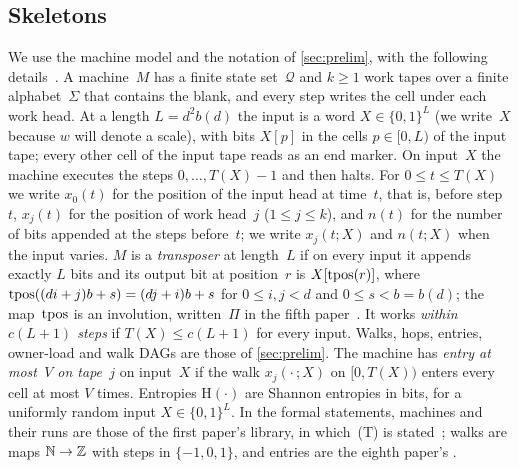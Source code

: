 \subsection{Skeletons}\label{sec:skel-skeletons}

We use the machine model and the notation of \cref{sec:prelim}, with the following
details~\cite[Section~2.1]{BoundedNesting2026}. A machine~$M$ has a finite state set~$\mathcal Q$ and $k\ge1$ work tapes
over a finite alphabet~$\Sigma$ that contains the blank, and every step writes the cell under each work head. At a length
$L=d^2b(d)$ the input is a word $X\in\{0,1\}^L$ (we write~$X$ because $w$ will denote a scale), with bits $X[p]$ in the
cells $p\in[0,L)$ of the input tape; every other cell of the input tape reads as an end marker. On input~$X$ the machine
executes the steps $0,\dots,T(X)-1$ and then halts. For $0\le t\le T(X)$ we write $x_0(t)$ for the position of the input
head at time~$t$, that is, before step~$t$, $x_j(t)$ for the position of work head~$j$ ($1\le j\le k$), and $n(t)$ for
the number of bits appended at the steps before~$t$; we write $x_j(t;X)$ and $n(t;X)$ when the input varies. $M$ is a
\emph{transposer} at length~$L$ if on every input it appends exactly $L$ bits and its output bit at position~$r$ is
$X[\operatorname{tpos}(r)]$, where $\operatorname{tpos}((di+j)b+s)=(dj+i)b+s$ for $0\le i,j<d$ and $0\le s<b=b(d)$; the map~$\operatorname{tpos}$ is an
involution, written~$\Pi$ in the fifth paper~\cite[(3.1)]{DirectedRecovery2026}. It works \emph{within $c(L+1)$ steps}
if $T(X)\le c(L+1)$ for every input. Walks, hops, entries, owner-load and walk DAGs are those of \cref{sec:prelim}. The
machine has \emph{entry at most~$V$ on tape~$j$} on input~$X$ if the walk $x_j(\cdot\,;X)$ on $[0,T(X))$ enters every
cell at most $V$ times. Entropies $\mathrm H(\cdot)$ are Shannon entropies in bits, for a uniformly random input
$X\in\{0,1\}^L$. In the formal statements, machines and their runs are those of the first paper's library, in which~(T)
is stated~\cite{FirstPaper2026}; walks are maps $\mathbb{N}\to\mathbb{Z}$ with steps in $\{-1,0,1\}$, and entries are the eighth paper's
.

